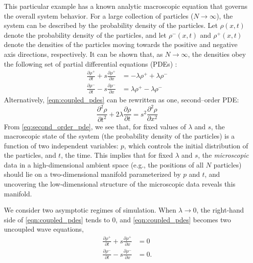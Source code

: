 \documentclass[preprint]{elsarticle}
\begin{document}
This particular example has a known analytic macroscopic equation that governs the overall system behavior.
%
For a large collection of particles ($N \rightarrow \infty$), the system can be described by the probability density of the particles.
%
Let $\rho(x, t)$ denote the probability density of the particles, and let $\rho^-(x, t)$ and $\rho^+(x, t)$ denote the densities of the particles moving towards the positive and negative axis directions, respectively.
%
It can be shown that, as $N \rightarrow \infty$, the densities obey the following set of partial differential equations (PDEs) \cite{othmer2000diffusion}:
\begin{equation} \label{eqn:coupled_pdes}
\begin{aligned}
\frac{\partial \rho^+}{\partial t} + s \frac{\partial \rho^+}{\partial x} & = -\lambda \rho^+ +\lambda \rho^- \\
\frac{\partial \rho^-}{\partial t} - s \frac{\partial \rho^-}{\partial x} & = \lambda \rho^+ -\lambda \rho^- 
\end{aligned}
\end{equation}
%
Alternatively, \eqref{eqn:coupled_pdes} can be rewritten as one, second--order PDE:
\begin{equation} \label{eq:second_order_pde}
\frac{\partial^2 \rho}{\partial t^2} + 2 \lambda \frac{\partial \rho}{\partial t} = s^2 \frac{\partial ^2 \rho}{\partial x^2}
\end{equation}
%
%
From \eqref{eq:second_order_pde}, we see that, for fixed values of $\lambda$ and $s$, the macroscopic state of the system (the probability density of the particles) is a function of two independent variables: $p$, which controls the initial distribution of the particles, and $t$, the time. 
%
This implies that for fixed $\lambda$ and $s$, the {\em microscopic} data in a high-dimensional ambient space (e.g., the positions of all $N$ particles) should lie on a two-dimensional manifold parameterized by $p$ and $t$, 
and uncovering the low-dimensional structure of the microscopic data reveals this manifold.

We consider two asymptotic regimes of simulation.
%
When $\lambda \rightarrow 0$, the right-hand side of \eqref{eqn:coupled_pdes} tends to 0, and \eqref{eqn:coupled_pdes} becomes two uncoupled wave equations,
\begin{equation}
\begin{aligned}
\frac{\partial \rho^+}{\partial t} + s \frac{\partial \rho^+}{\partial x} & = 0 \\
\frac{\partial \rho^-}{\partial t} - s \frac{\partial \rho^-}{\partial x} & = 0.
\end{aligned}
\end{equation}
\end{document}
